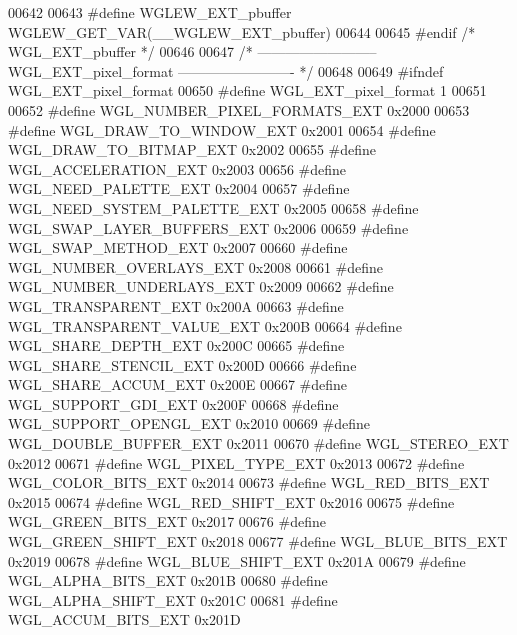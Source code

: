 \begin{DoxyCode}
00642 
00643 \textcolor{preprocessor}{#define WGLEW\_EXT\_pbuffer WGLEW\_GET\_VAR(\_\_WGLEW\_EXT\_pbuffer)}
00644 
00645 \textcolor{preprocessor}{#endif }\textcolor{comment}{/* WGL\_EXT\_pbuffer */}\textcolor{preprocessor}{}
00646 
00647 \textcolor{comment}{/* -------------------------- WGL\_EXT\_pixel\_format ------------------------- */}
00648 
00649 \textcolor{preprocessor}{#ifndef WGL\_EXT\_pixel\_format}
00650 \textcolor{preprocessor}{#define WGL\_EXT\_pixel\_format 1}
00651 
00652 \textcolor{preprocessor}{#define WGL\_NUMBER\_PIXEL\_FORMATS\_EXT 0x2000}
00653 \textcolor{preprocessor}{#define WGL\_DRAW\_TO\_WINDOW\_EXT 0x2001}
00654 \textcolor{preprocessor}{#define WGL\_DRAW\_TO\_BITMAP\_EXT 0x2002}
00655 \textcolor{preprocessor}{#define WGL\_ACCELERATION\_EXT 0x2003}
00656 \textcolor{preprocessor}{#define WGL\_NEED\_PALETTE\_EXT 0x2004}
00657 \textcolor{preprocessor}{#define WGL\_NEED\_SYSTEM\_PALETTE\_EXT 0x2005}
00658 \textcolor{preprocessor}{#define WGL\_SWAP\_LAYER\_BUFFERS\_EXT 0x2006}
00659 \textcolor{preprocessor}{#define WGL\_SWAP\_METHOD\_EXT 0x2007}
00660 \textcolor{preprocessor}{#define WGL\_NUMBER\_OVERLAYS\_EXT 0x2008}
00661 \textcolor{preprocessor}{#define WGL\_NUMBER\_UNDERLAYS\_EXT 0x2009}
00662 \textcolor{preprocessor}{#define WGL\_TRANSPARENT\_EXT 0x200A}
00663 \textcolor{preprocessor}{#define WGL\_TRANSPARENT\_VALUE\_EXT 0x200B}
00664 \textcolor{preprocessor}{#define WGL\_SHARE\_DEPTH\_EXT 0x200C}
00665 \textcolor{preprocessor}{#define WGL\_SHARE\_STENCIL\_EXT 0x200D}
00666 \textcolor{preprocessor}{#define WGL\_SHARE\_ACCUM\_EXT 0x200E}
00667 \textcolor{preprocessor}{#define WGL\_SUPPORT\_GDI\_EXT 0x200F}
00668 \textcolor{preprocessor}{#define WGL\_SUPPORT\_OPENGL\_EXT 0x2010}
00669 \textcolor{preprocessor}{#define WGL\_DOUBLE\_BUFFER\_EXT 0x2011}
00670 \textcolor{preprocessor}{#define WGL\_STEREO\_EXT 0x2012}
00671 \textcolor{preprocessor}{#define WGL\_PIXEL\_TYPE\_EXT 0x2013}
00672 \textcolor{preprocessor}{#define WGL\_COLOR\_BITS\_EXT 0x2014}
00673 \textcolor{preprocessor}{#define WGL\_RED\_BITS\_EXT 0x2015}
00674 \textcolor{preprocessor}{#define WGL\_RED\_SHIFT\_EXT 0x2016}
00675 \textcolor{preprocessor}{#define WGL\_GREEN\_BITS\_EXT 0x2017}
00676 \textcolor{preprocessor}{#define WGL\_GREEN\_SHIFT\_EXT 0x2018}
00677 \textcolor{preprocessor}{#define WGL\_BLUE\_BITS\_EXT 0x2019}
00678 \textcolor{preprocessor}{#define WGL\_BLUE\_SHIFT\_EXT 0x201A}
00679 \textcolor{preprocessor}{#define WGL\_ALPHA\_BITS\_EXT 0x201B}
00680 \textcolor{preprocessor}{#define WGL\_ALPHA\_SHIFT\_EXT 0x201C}
00681 \textcolor{preprocessor}{#define WGL\_ACCUM\_BITS\_EXT 0x201D}

\end{DoxyCode}
